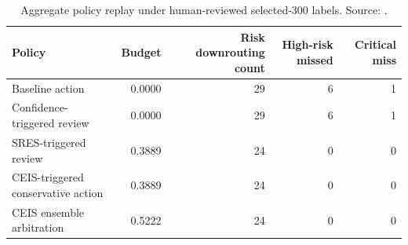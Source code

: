 \begin{table}[htbp]
\centering
\caption{Aggregate policy replay under human-reviewed selected-300 labels. Source: .}
\label{tab:policy}
\small
\begin{tabularx}{\linewidth}{@{}Lrrrr@{}}
\toprule
Policy & Budget & Risk downrouting count & High-risk missed & Critical miss \\
\midrule
Baseline action & 0.0000 & 29 & 6 & 1 \\
Confidence-triggered review & 0.0000 & 29 & 6 & 1 \\
SRES-triggered review & 0.3889 & 24 & 0 & 0 \\
CEIS-triggered conservative action & 0.3889 & 24 & 0 & 0 \\
CEIS ensemble arbitration & 0.5222 & 24 & 0 & 0 \\
\bottomrule
\end{tabularx}
\end{table}
